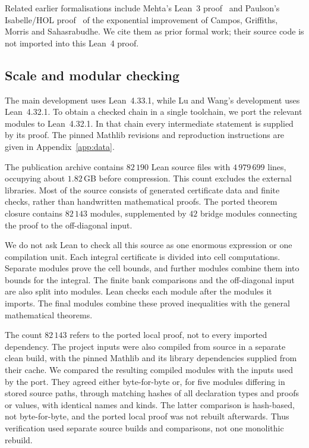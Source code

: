 \documentclass[11pt]{article}
\theoremstyle{definition}
\theoremstyle{remark}
\begin{document}
Related earlier formalisations include Mehta's Lean~3 proof~\cite{Mehta} and Paulson's Isabelle/HOL
proof~\cite{Paulson} of the exponential improvement of Campos, Griffiths, Morris and Sahasrabudhe.
We cite them as prior formal work; their source code is not imported into this Lean~4 proof.

\subsection{Scale and modular checking}

The main development uses Lean~4.33.1, while Lu and Wang's development uses Lean~4.32.1.
To obtain a checked chain in a single toolchain, we port the relevant modules to Lean~4.32.1.
In that chain every intermediate statement is supplied by its proof.
The pinned Mathlib revisions and reproduction instructions are given in Appendix~\ref{app:data}.

The publication archive contains $82\,190$ Lean source files with $4\,979\,699$ lines, occupying about
$1.82$\,GB before compression. This count excludes the external libraries.
Most of the source consists of generated certificate data and finite checks, rather than
handwritten mathematical proofs. The ported theorem closure contains $82\,143$ modules, supplemented by
$42$ bridge modules connecting the proof to the off-diagonal input.

We do not ask Lean to check all this source as one enormous expression or one compilation unit.
Each integral certificate is divided into cell computations. Separate modules prove the cell bounds,
and further modules combine them into bounds for the integral. The finite bank comparisons and the
off-diagonal input are also split into modules. Lean checks each module after the modules it imports.
The final modules combine these proved inequalities with the general mathematical theorems.

The count $82\,143$ refers to the ported local proof, not to every imported dependency.
The project inputs were also compiled from source in a separate clean build, with the pinned Mathlib and
its library dependencies supplied from their cache. We compared the resulting compiled modules with the
inputs used by the port. They agreed either byte-for-byte or, for five modules differing in stored source paths,
through matching hashes of all declaration types and proofs or values, with identical names and kinds.
The latter comparison is hash-based, not byte-for-byte, and the ported local proof was not rebuilt afterwards.
Thus verification used separate source builds and comparisons, not one monolithic rebuild.
\end{document}

